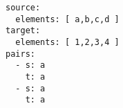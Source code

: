 \begin{verbatim}
source:
  elements: [ a,b,c,d ]
target:
  elements: [ 1,2,3,4 ]
pairs:
  - s: a
    t: a
  - s: a
    t: a

\end{verbatim}